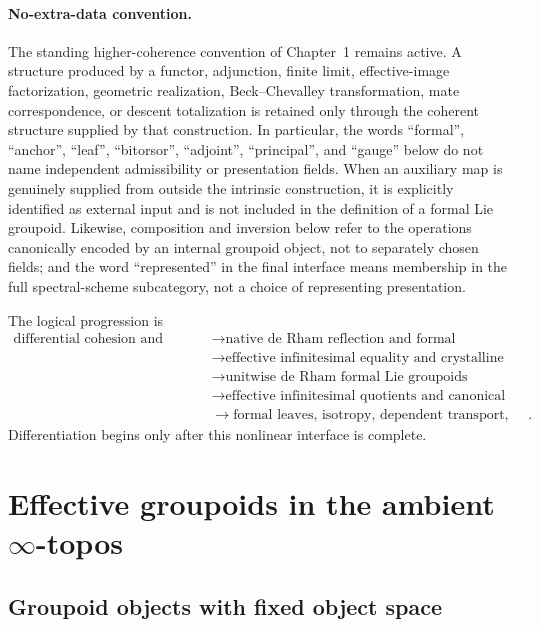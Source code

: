 \paragraph{No-extra-data convention.}
The standing higher-coherence convention of Chapter~1 remains active.  A
structure produced by a functor, adjunction, finite limit, effective-image
factorization, geometric realization, Beck--Chevalley transformation, mate
correspondence, or descent totalization is retained only through the coherent
structure supplied by that construction.  In particular, the words
``formal'', ``anchor'', ``leaf'', ``bitorsor'', ``adjoint'', ``principal'',
and ``gauge'' below do not name independent admissibility or
presentation fields.  When an auxiliary map is genuinely supplied from
outside the intrinsic construction, it is explicitly identified as external
input and is not included in the definition of a formal Lie groupoid.
Likewise, composition and inversion below refer to the operations canonically
encoded by an internal groupoid object, not to separately chosen fields; and
the word ``represented'' in the final interface means membership in the full
spectral-scheme subcategory, not a choice of representing presentation.

The logical progression is
\[
\boxed{
\begin{aligned}
\text{differential cohesion and infinitesimal shape}
&\longrightarrow
\text{native de Rham reflection and formal \'etalification}
\\
&\longrightarrow
\text{effective infinitesimal equality and crystalline transport}
\\
&\longrightarrow
\text{unitwise de Rham formal Lie groupoids}
\\
&\longrightarrow
\text{effective infinitesimal quotients and canonical anchors}
\\
&\longrightarrow
\text{formal leaves, isotropy, dependent transport, and crystalline descent}.
\end{aligned}}
\]
Differentiation begins only after this nonlinear interface is complete.

\section{Effective groupoids in the ambient $\infty$-topos}
\label{sec:flg-effective-groupoids}

\subsection{Groupoid objects with fixed object space}

